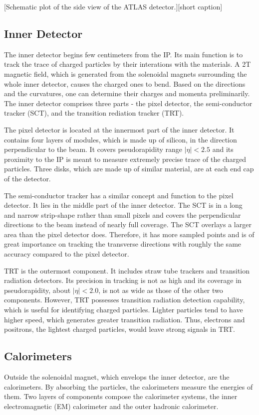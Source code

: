\documentclass[class=NCU_thesis, crop=false]{standalone}
\begin{document}
	[Schematic plot of the side view of the ATLAS detector.][short caption]
	
	\subsection{Inner Detector}
		The inner detector begins few centimeters from the IP. Its main function is to track the trace of charged particles by their interations with the materials. A 2T magnetic field, which is generated from the solenoidal magnets surrounding the whole inner detector, causes the charged ones to bend. Based on the directions and the curvatures, one can determine their charges and momenta preliminarily. The inner detector comprises three parts - the pixel detector, the semi-conductor tracker (SCT), and the transition rediation tracker (TRT).
		
		The pixel detector is located at the innermost part of the inner detector. It contains four layers of modules, which is made up of silicon, in the direction perpendicular to the beam. It covers pseudorapidity range $\lvert \eta \rvert < 2.5$ and its proximity to the IP is meant to measure extremely precise trace of the charged particles. Three disks, which are made up of similar material, are at each end cap of the detector.
		
		The semi-conductor tracker has a similar concept and function to the pixel detector. It lies in the middle part of the inner detector. The SCT is in a long and narrow strip-shape rather than small pixels and covers the perpendicular directions to the beam instead of nearly full coverage. The SCT overlays a larger area than the pixel detector does. Therefore, it has more sampled points and is of great importance on tracking the transverse directions with roughly the same accuracy compared to the pixel detector.
		
		TRT is the outermost component. It includes straw tube trackers and transition radiation detectors. Its precision in tracking is not as high and its coverage in pseudorapidity, about $\rvert \eta \lvert < 2.0$, is not as wide as those of the other two components. However, TRT possesses transition radiation detection capability, which is useful for identifying charged particles. Lighter particles tend to have higher speed, which generates greater transition radiation. Thus, electrons and positrons, the lightest charged particles, would leave strong signals in TRT.
	
	\subsection{Calorimeters}
		Outside the solenoidal magnet, which envelops the inner detector, are the calorimeters. By absorbing the particles, the calorimeters measure the energies of them. Two layers of components compose the calorimeter systems, the inner electromagnetic (EM) calorimeter and the outer hadronic calorimeter.
		
\end{document}
